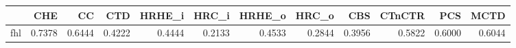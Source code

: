 \begin{tabular}{lrrrrrrrrrrr}
\toprule
 & CHE & CC & CTD & HRHE_i & HRC_i & HRHE_o & HRC_o & CBS & CTnCTR & PCS & MCTD \\
\midrule
fhl & 0.7378 & 0.6444 & 0.4222 & 0.4444 & 0.2133 & 0.4533 & 0.2844 & 0.3956 & 0.5822 & 0.6000 & 0.6044 \\
\bottomrule
\end{tabular}
